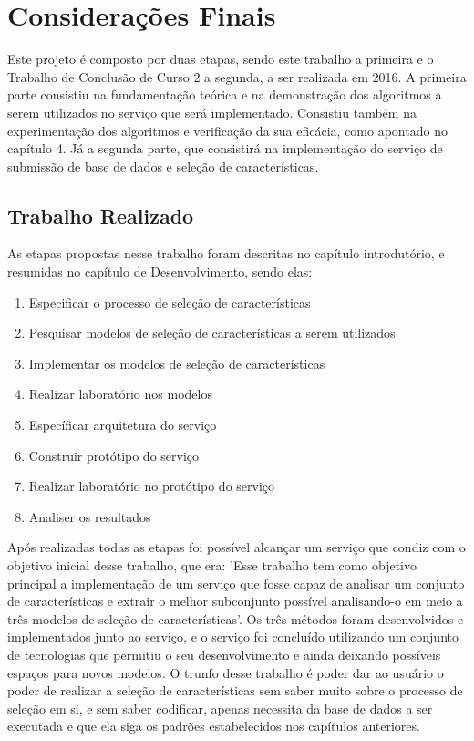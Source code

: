 \chapter[Considerações Finais]{Considerações Finais}

Este projeto é composto por duas etapas, sendo este trabalho a primeira e o Trabalho de Conclusão de Curso 2 a segunda, a ser realizada em 2016. A primeira parte consistiu na fundamentação teórica e na demonstração dos algoritmos a serem utilizados no serviço que será implementado. Consistiu também na experimentação dos algoritmos e verificação da sua eficácia, como apontado no capítulo 4. Já a segunda parte, que consistirá na implementação do serviço de submissão de base de dados e seleção de características. 

\section{Trabalho Realizado}

As etapas propostas nesse trabalho foram descritas no capítulo introdutório, e resumidas no capítulo de Desenvolvimento, sendo elas:

\begin{enumerate}
	\item{Especificar o processo de seleção de características}
	\item{Pesquisar modelos de seleção de características a serem utilizados}
	\item{Implementar os modelos de seleção de características}
	\item{Realizar laboratório nos modelos}
	\item{Específicar arquitetura do serviço}
	\item{Construir protótipo do serviço}
	\item{Realizar laboratório no protótipo do serviço}
	\item{Analiser os resultados}
\end{enumerate}

Após realizadas todas as etapas foi possível alcançar um serviço que condiz com o objetivo inicial desse trabalho, que era: 'Esse trabalho tem como objetivo principal a implementação de um serviço que fosse capaz de analisar um conjunto de características e extrair o melhor subconjunto possível analisando-o em meio a três modelos de seleção de características'. Os três métodos foram desenvolvidos e implementados junto ao serviço, e o serviço foi concluído utilizando um conjunto de tecnologias que permitiu o seu desenvolvimento e ainda deixando possíveis espaços para novos modelos. O trunfo desse trabalho é poder dar ao usuário o poder de realizar a seleção de características sem saber muito sobre o processo de seleção em si, e sem saber codificar, apenas necessita da base de dados a ser executada e que ela siga os padrões estabelecidos nos capítulos anteriores.


